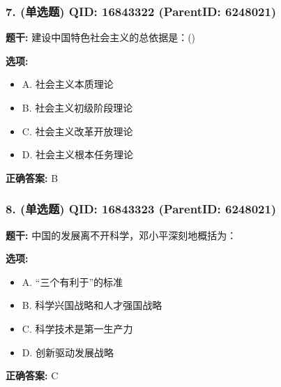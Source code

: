 \documentclass[12pt,UTF8]{ctexart}
\begin{document}
\subsubsection*{7. (单选题) \small QID: 16843322 (ParentID: 6248021)}

\textbf{题干:}
建设中国特色社会主义的总依据是：()



\textbf{选项:}
\begin{itemize}[leftmargin=*]

  \item A. 社会主义本质理论

  \item B. 社会主义初级阶段理论

  \item C. 社会主义改革开放理论

  \item D. 社会主义根本任务理论

\end{itemize}

\textbf{正确答案:}
B

\vspace{0.3em}\hrulefill\vspace{0.7em}

\subsubsection*{8. (单选题) \small QID: 16843323 (ParentID: 6248021)}

\textbf{题干:}
中国的发展离不开科学，邓小平深刻地概括为：



\textbf{选项:}
\begin{itemize}[leftmargin=*]

  \item A. “三个有利于”的标准

  \item B. 科学兴国战略和人才强国战略

  \item C. 科学技术是第一生产力

  \item D. 创新驱动发展战略

\end{itemize}

\textbf{正确答案:}
C

\vspace{0.3em}\hrulefill\vspace{0.7em}
\end{document}
